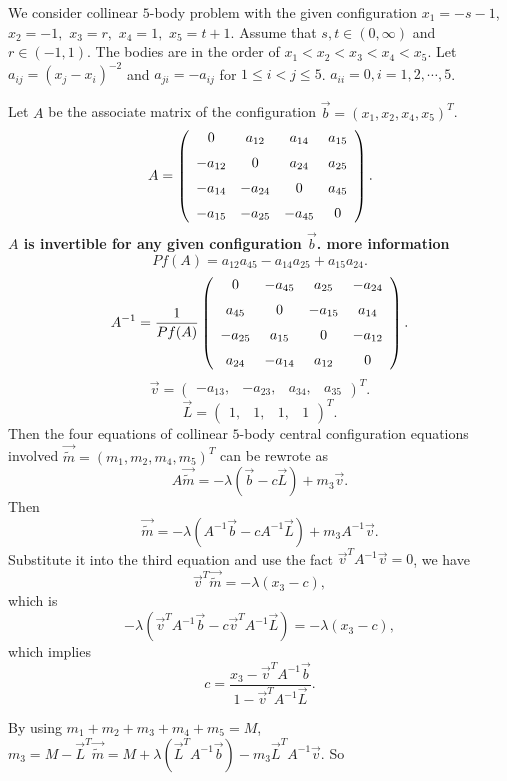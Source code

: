 \documentclass[11pt,leqno]{article}
\theoremstyle{definition}
\theoremstyle{remark}
\numberwithin{equation}{section}
\begin{document}
We consider collinear $5$-body problem with the given configuration $x_1=-s-1$, $x_2=-1,$ $x_3=r,$ $x_4=1,$ $x_5=t+1$. Assume that $s, t\in (0, \infty)$ and $r\in (-1, 1)$.  The bodies are in the order of $x_1<x_2<x_3<x_4<x_5$. Let $a_{ij}=(x_j-x_i)^{-2}$  and $a_{ji}=-a_{ij}$ for $1\leq i<j\leq 5$.  $a_{ii}=0, i=1,2,\cdots, 5$. 

Let $A$ be the associate matrix of the configuration $\vec{b}=(x_1, x_2, x_4, x_5)^T$.
$$A=\left( \begin {array}{cccc} 0&  a_{12}& a_{14}& a_{15}
\\ \noalign{\medskip}-a_{12}&0& a_{24}& a_{25}
\\ \noalign{\medskip}-a_{14}&- a_{24}&0& a_{45}
\\ \noalign{\medskip}- a_{15}&- a_{25}&- a_{45}&0\end {array}
 \right).
$$
{\bf $A$ is invertible for any given configuration $\vec{b}$. more information }
$$Pf(A)=  a_{12}  a_{45}- a_{14} a_{25}+ a_{15} a_{24}.$$
$$A^{-1}= \frac{1}{Pf(A)}\left( \begin {array}{cccc} 0&-a_{45}& a_{25}&- a_{24}
\\ \noalign{\medskip}a_{45}&0&- a_{15}& a_{14}
\\ \noalign{\medskip}- a_{25}& a_{15}&0&- a_{12}
\\ \noalign{\medskip}a_{24}&- a_{14}& a_{12}&0\end {array}
 \right). 
$$
$$\vec{v}= \left( \begin {array}{cccc} - a_{13},&- a_{23},&a_{34},&  a_{35}
\end {array} \right)^T. $$
$$\vec{L}=\left( \begin {array}{cccc} 1,&1,&1,&1\end {array} \right)^T.$$
Then the four equations of collinear $5$-body central configuration equations involved $\vec{\tilde{m}}=(m_1, m_2, m_4, m_5)^T$ can be rewrote as 
$$A\vec{\tilde{m}}=-\lambda(\vec{b}-c\vec{L})+m_3\vec{v}.$$
Then
$$\vec{\tilde{m}}=-\lambda(A^{-1}\vec{b}-cA^{-1}\vec{L})+m_3A^{-1}\vec{v}.$$
Substitute it into the third equation and use the fact $\vec{v}^TA^{-1}\vec{v}=0$, we have
$$\vec{v}^{T}\vec{\tilde{m}}=-\lambda(x_3-c),$$
which is 
$$-\lambda(\vec{v}^{T}A^{-1}\vec{b}-c\vec{v}^TA^{-1}\vec{L})=-\lambda(x_3-c),$$
which implies 
$$c=\frac{x_3-\vec{v}^TA^{-1}\vec{b}}{1-\vec{v}^TA^{-1}\vec{L}}.$$

By using $m_1+m_2+m_3+m_4+m_5=M$, $m_3=M-\vec{L}^T \vec{\tilde{m}}=M+\lambda(\vec{L}^TA^{-1}\vec{b})-m_3\vec{L}^TA^{-1}\vec{v}$. So
\end{document}
